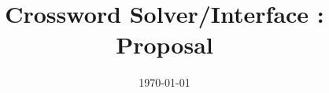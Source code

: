 \documentclass{article}
\title{Crossword Solver/Interface : Proposal}
\author{}
\date{\today}
\begin{document}
\maketitle

\nocite{*}



\end{document}
